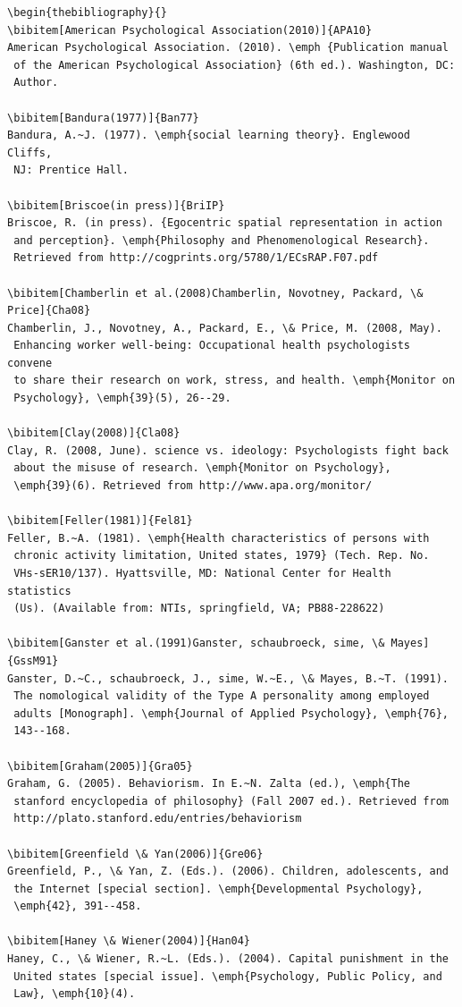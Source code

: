 \documentclass[]{interact}
\theoremstyle{plain}%
\theoremstyle{definition}
\theoremstyle{remark}
\begin{document}
\begin{verbatim}
\begin{thebibliography}{}
\bibitem[American Psychological Association(2010)]{APA10}
American Psychological Association. (2010). \emph {Publication manual
 of the American Psychological Association} (6th ed.). Washington, DC:
 Author.

\bibitem[Bandura(1977)]{Ban77}
Bandura, A.~J. (1977). \emph{social learning theory}. Englewood Cliffs,
 NJ: Prentice Hall.

\bibitem[Briscoe(in press)]{BriIP}
Briscoe, R. (in press). {Egocentric spatial representation in action
 and perception}. \emph{Philosophy and Phenomenological Research}.
 Retrieved from http://cogprints.org/5780/1/ECsRAP.F07.pdf

\bibitem[Chamberlin et al.(2008)Chamberlin, Novotney, Packard, \& Price]{Cha08}
Chamberlin, J., Novotney, A., Packard, E., \& Price, M. (2008, May).
 Enhancing worker well-being: Occupational health psychologists convene
 to share their research on work, stress, and health. \emph{Monitor on
 Psychology}, \emph{39}(5), 26--29.

\bibitem[Clay(2008)]{Cla08}
Clay, R. (2008, June). science vs. ideology: Psychologists fight back
 about the misuse of research. \emph{Monitor on Psychology},
 \emph{39}(6). Retrieved from http://www.apa.org/monitor/

\bibitem[Feller(1981)]{Fel81}
Feller, B.~A. (1981). \emph{Health characteristics of persons with
 chronic activity limitation, United states, 1979} (Tech. Rep. No.
 VHs-sER10/137). Hyattsville, MD: National Center for Health statistics
 (Us). (Available from: NTIs, springfield, VA; PB88-228622)

\bibitem[Ganster et al.(1991)Ganster, schaubroeck, sime, \& Mayes]{GssM91}
Ganster, D.~C., schaubroeck, J., sime, W.~E., \& Mayes, B.~T. (1991).
 The nomological validity of the Type A personality among employed
 adults [Monograph]. \emph{Journal of Applied Psychology}, \emph{76},
 143--168.

\bibitem[Graham(2005)]{Gra05}
Graham, G. (2005). Behaviorism. In E.~N. Zalta (ed.), \emph{The
 stanford encyclopedia of philosophy} (Fall 2007 ed.). Retrieved from
 http://plato.stanford.edu/entries/behaviorism

\bibitem[Greenfield \& Yan(2006)]{Gre06}
Greenfield, P., \& Yan, Z. (Eds.). (2006). Children, adolescents, and
 the Internet [special section]. \emph{Developmental Psychology},
 \emph{42}, 391--458.

\bibitem[Haney \& Wiener(2004)]{Han04}
Haney, C., \& Wiener, R.~L. (Eds.). (2004). Capital punishment in the
 United states [special issue]. \emph{Psychology, Public Policy, and
 Law}, \emph{10}(4).


\end{verbatim}
\end{document}
